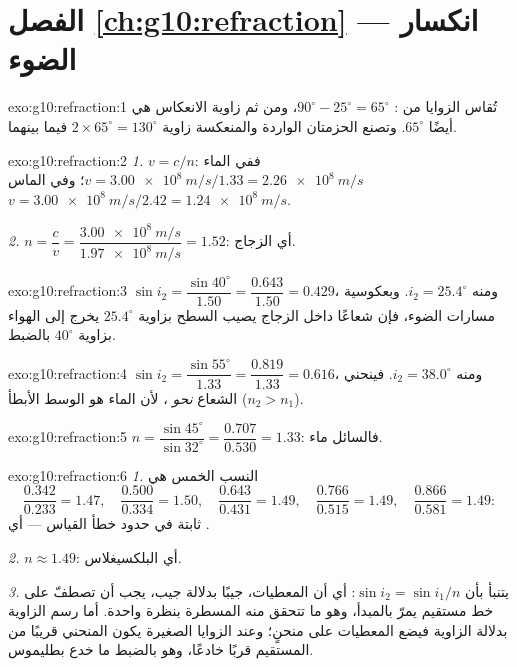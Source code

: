 \section*{الفصل \ref{ch:g10:refraction} --- انكسار الضوء}

\begin{solution}{exo:g10:refraction:1}
تُقاس الزوايا من : 
$90^\circ - 25^\circ = 65^\circ$، ومن ثم زاوية الانعكاس هي أيضًا
$65^\circ$. وتصنع الحزمتان الواردة والمنعكسة زاوية
$2 \times 65^\circ = 130^\circ$ فيما بينهما.
\end{solution}

\begin{solution}{exo:g10:refraction:2}
\emph{1.} $v = c/n$: ففي الماء
$v = \qty{3.00e8}{m/s}/1.33 = \qty{2.26e8}{m/s}$؛ وفي الماس
$v = \qty{3.00e8}{m/s}/2.42 = \qty{1.24e8}{m/s}$.

\emph{2.} $n = \dfrac{c}{v} = \dfrac{\qty{3.00e8}{m/s}}
{\qty{1.97e8}{m/s}} = 1.52$: أي الزجاج.
\end{solution}

\begin{solution}{exo:g10:refraction:3}
$\sin i_2 = \dfrac{\sin 40^\circ}{1.50} = \dfrac{0.643}{1.50} = 0.429$،
ومنه $i_2 = 25.4^\circ$. وبعكوسية مسارات الضوء، فإن شعاعًا داخل
الزجاج يصيب السطح بزاوية $25.4^\circ$ يخرج إلى الهواء بزاوية
$40^\circ$ بالضبط.
\end{solution}

\begin{solution}{exo:g10:refraction:4}
$\sin i_2 = \dfrac{\sin 55^\circ}{1.33} = \dfrac{0.819}{1.33} = 0.616$،
ومنه $i_2 = 38.0^\circ$. فينحني الشعاع \emph{نحو} ، لأن
الماء هو الوسط الأبطأ ($n_2 > n_1$).
\end{solution}

\begin{solution}{exo:g10:refraction:5}
$n = \dfrac{\sin 45^\circ}{\sin 32^\circ} = \dfrac{0.707}{0.530}
= 1.33$: فالسائل ماء.
\end{solution}

\begin{solution}{exo:g10:refraction:6}
\emph{1.} النسب الخمس هي
\[
\frac{0.342}{0.233} = 1.47,\quad
\frac{0.500}{0.334} = 1.50,\quad
\frac{0.643}{0.431} = 1.49,\quad
\frac{0.766}{0.515} = 1.49,\quad
\frac{0.866}{0.581} = 1.49 :
\]
ثابتة في حدود خطأ القياس --- أي .

\emph{2.} $n \approx 1.49$: أي البلكسيغلاس.

\emph{3.} يتنبأ  بأن $\sin i_2 = \sin i_1 / n$: أي أن المعطيات، جيبًا
بدلالة جيب، يجب أن تصطفّ على خط مستقيم يمرّ بالمبدأ، وهو ما
تتحقق منه المسطرة بنظرة واحدة. أما رسم الزاوية بدلالة الزاوية فيضع المعطيات على
منحنٍ؛ وعند الزوايا الصغيرة يكون المنحني قريبًا من المستقيم قربًا
خادعًا، وهو بالضبط ما خدع بطليموس.
\end{solution}

